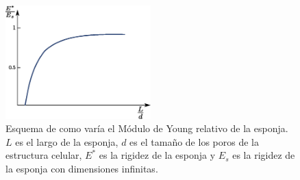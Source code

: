 \documentclass[a4paper,12pt,fleqn,twoside,openany]{book}
\begin{document}

\begin{figure}[h]
 \centering
 \includegraphics[width=0.5\textwidth]{Etam.eps}
 \caption{Esquema de como varía el Módulo de Young relativo de la esponja. $L$ es el largo de la esponja, $d$ es el tamaño de los poros de 
 la estructura celular, $E^*$ es la rigidez de la esponja y $E_s$ es la rigidez de la esponja con dimensiones infinitas.}
\end{figure}

\end{document}
